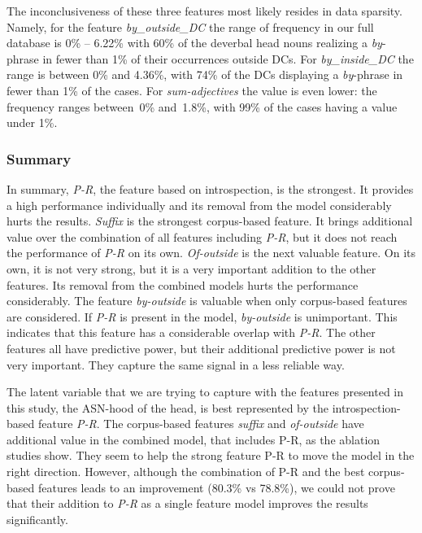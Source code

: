 \documentclass[output=paper]{langsci/langscibook}
\begin{document}
The inconclusiveness of these three features most likely resides in data sparsity. Namely, for the feature {\textit{by\_outside\_DC}} the range of frequency in our full database is 0\% -- 6.22\% with 60\% of the deverbal head nouns realizing a \textit{by}-phrase in fewer than 1\% of their occurrences outside DCs. For \textit{by\_inside\_DC} the range is between 0\% and 4.36\%, with 74\% of the DCs displaying a \textit{by}-phrase  in fewer than 1\% of the cases. For \textit{sum-adjectives} the value is even lower: the frequency ranges between~0\% and~1.8\%, with 99\% of the cases having a value under 1\%. 

\subsubsection{Summary}
In summary, \textit{P-R}, the feature based on introspection, is the strongest. It provides a high performance individually and its removal from the model considerably hurts the results. \textit{Suffix} is the strongest corpus-based feature. It brings additional value over the combination of all features including  \textit{P-R}, but it does not reach the performance of \textit{P-R} on its own. \textit{Of-outside} is the next valuable feature. On its own, it is not very strong, but it is a very important addition to the other features. Its removal from the combined models hurts the performance considerably. The feature \textit{by-outside} is valuable when only corpus-based features are considered. If \textit{P-R }is present in the model, \textit{by-outside} is unimportant. This indicates that this feature has a considerable overlap with \textit{P-R}. The other features all have predictive power, but their additional predictive power is not very important. They capture the same signal in a less reliable way.

The latent variable that we are trying to capture with the features presented in this study, the ASN-hood of the head, is best represented by the introspection-based feature \textit{P-R}. The corpus-based features \textit{suffix} and \textit{of-outside} have additional value in the combined model, that includes P-R, as the ablation studies show. They seem to help the strong feature P-R to move the model in the right direction. However, although the combination of P-R and the best corpus-based features leads to an improvement (80.3\% vs 78.8\%), we could not prove that their addition to \textit{P-R} as a single feature model improves the results significantly.
\end{document}
